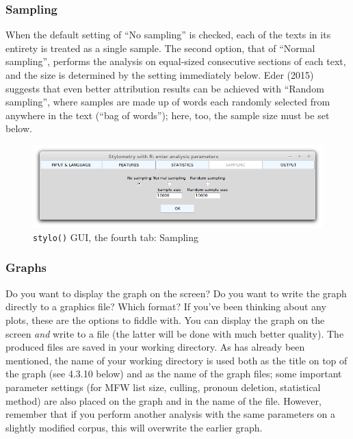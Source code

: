 \documentclass[11pt,a4paper]{article}
\def\margin#1{\marginpar{\textcolor{blue}{\footnotesize\tt #1}}}
\def\code#1{{\tt #1}}
\begin{document}
\subsubsection{Sampling}

When the default setting of ``No sampling'' is 
checked\margin{sampling=}\margin{"no.sampling"}, each of
the texts in its entirety is treated as a single sample. The second
option, that of ``Normal sampling''\margin{"normal.sampling"}, 
performs the analysis on equal-sized
consecutive sections of each text, and the size is determined by the
setting immediately below. Eder (2015) suggests that even better attribution
results can be achieved with ``Random sampling''\margin{"random.sampling"}, 
where samples are made up of words each randomly selected from anywhere 
in the text (``bag of words'');\margin{sample.size=}\margin{<integer>} here, 
too, the sample size must be set below.

\begin{figure}
  \centering
  \includegraphics[width=0.8\linewidth]{img/stylo-gui_tab4.png}
  \caption{\code{stylo()} GUI, the fourth tab: Sampling}
\end{figure}


\subsubsection{Graphs}

Do you want to display the graph on the screen? Do you want to write
the graph directly to a graphics file? Which format? If you've been
thinking about any plots, these are the options to fiddle with. You
can display the graph on the screen \emph{and} write to a file (the
latter will be done with much better quality). The produced files
are saved in your working directory. As has already been mentioned,
the name of your working directory is used both as the title on top
of the graph (see 4.3.10 below) and as the name of the graph files;
some important parameter settings (for MFW list size, culling, pronoun
deletion, statistical method) are also placed on the graph and in
the name of the file. However, remember that if you perform another
analysis with the same parameters on a slightly modified corpus, this
will overwrite the earlier graph.
\end{document}
